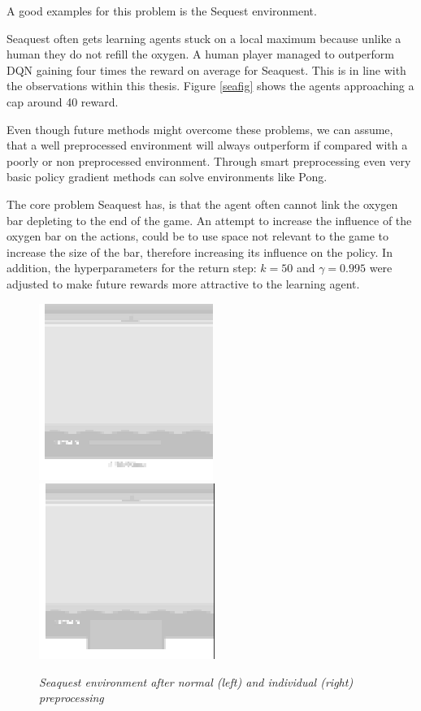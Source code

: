 A good examples for this problem is the Sequest environment. 

Seaquest often gets learning agents stuck on a local maximum because unlike a human they do not refill the oxygen.
A human player managed to outperform DQN \citep{nature} gaining four times the reward on average for Seaquest.
This is in line with the observations within this thesis. Figure \ref{seafig} shows the agents approaching a cap around 40 reward.

Even though future methods might overcome these problems, we can assume, that a well preprocessed environment will always outperform if compared with a poorly or non preprocessed environment.
Through smart preprocessing even very basic policy gradient methods can solve environments like Pong.  \citep{karpathy}

The core problem Seaquest has, is that the agent often cannot link the oxygen bar depleting to the end of the game. 
An attempt to increase the influence of the oxygen bar on the actions, could be to use space not relevant to the game to increase the size of the bar, therefore increasing its influence on the policy.
In addition, the hyperparameters for the return step: $k=50$ and $\gamma =0.995$ were adjusted to make future rewards more attractive to the learning agent.

\begin{figure}[h]
\includegraphics[scale=1]{bilder/seaquestgamenopre.png}
\includegraphics[scale=1]{bilder/seaquestgameprepro.png}
\caption{\textit{Seaquest environment after normal (left) and individual (right) preprocessing}}
\end{figure}

